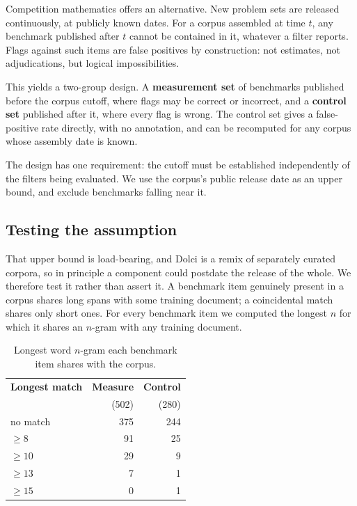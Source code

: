 \documentclass[11pt]{article}
\begin{document}
Competition mathematics offers an alternative. New problem sets are released
continuously, at publicly known dates. For a corpus assembled at time $t$, any
benchmark published after $t$ cannot be contained in it, whatever a filter
reports. Flags against such items are false positives by construction: not
estimates, not adjudications, but logical impossibilities.

This yields a two-group design. A \textbf{measurement set} of benchmarks
published before the corpus cutoff, where flags may be correct or incorrect, and
a \textbf{control set} published after it, where every flag is wrong. The control
set gives a false-positive rate directly, with no annotation, and can be
recomputed for any corpus whose assembly date is known.

The design has one requirement: the cutoff must be established independently of
the filters being evaluated. We use the corpus's public release date as an upper
bound, and exclude benchmarks falling near it.

\subsection{Testing the assumption}
\label{sec:validate}

That upper bound is load-bearing, and Dolci is a remix of separately curated
corpora, so in principle a component could postdate the release of the whole. We
therefore test it rather than assert it. A benchmark item genuinely present in a
corpus shares long spans with some training document; a coincidental match shares
only short ones. For every benchmark item we computed the longest $n$ for which it
shares an $n$-gram with any training document.

\begin{table}[h]
\centering
\small
\begin{tabular}{lrr}
\toprule
\textbf{Longest match} & \textbf{Measure} & \textbf{Control} \\
 & (502) & (280) \\
\midrule
no match      & 375 & 244 \\
$\geq 8$      &  91 &  25 \\
$\geq 10$     &  29 &   9 \\
$\geq 13$     &   7 &   1 \\
$\geq 15$     &   0 &   1 \\
\bottomrule
\end{tabular}
\caption{Longest word $n$-gram each benchmark item shares with the corpus.}
\label{tab:validate}
\end{table}
\end{document}
